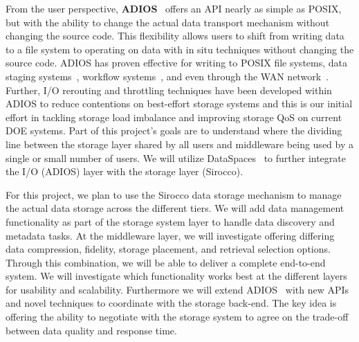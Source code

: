 From the user perspective,
{\bf ADIOS}~\cite{liu_helloadios,lofstead:2009:adaptible} offers an API nearly as simple as POSIX, but with the
ability to change the actual data transport mechanism without changing the
source code. This flexibility allows users to shift from writing data to a file system
to operating on data with in situ techniques without changing the source code.
ADIOS has proven effective for writing to POSIX file
systems, data staging systems~\cite{zheng:2010:predata,docan:2010:dataspaces,oldfield:2006:nessie}, workflow
systems~\cite{Dayal:2014:flexpath}, and even through the WAN network~\cite{zhang2014active}. Further,
I/O rerouting and throttling techniques \cite{liu_hotstorage,liu_helloadios} have been developed 
within ADIOS to reduce contentions on best-effort storage systems and this is our initial
effort in tackling storage load imbalance and improving storage QoS on current DOE systems.
Part of this project's goals are to understand where the dividing line
between the storage layer shared by all users and middleware being used by a
single or small number of users. We will utilize DataSpaces~\cite{docan:2010:dataspaces} to 
further integrate the I/O (ADIOS) layer with the storage layer (Sirocco).
%
% 

For this project, we plan to use the Sirocco data storage mechanism to manage
the actual data storage across the different tiers. We will add data management functionality as part of the storage
system layer to handle data discovery and metadata tasks. At the middleware
layer, we will investigate offering differing data compression, fidelity,
storage placement, and retrieval selection options.  Through this combination,
we will be able to deliver a complete end-to-end system. We will investigate
which functionality works best at the different layers for usability and
scalability. Furthermore we will  extend ADIOS~\cite{lofstead:2009:adaptible} with new APIs and novel
techniques to coordinate with the storage back-end. The key idea is offering
the ability to negotiate with the storage system to agree on the trade-off
between data quality and response time. 

